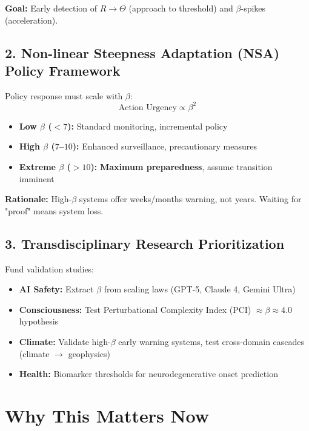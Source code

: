 \documentclass[11pt,a4paper]{article}
\begin{document}
\textbf{Goal:} Early detection of $R \to \Theta$ (approach to threshold) and $\beta$-spikes (acceleration).

\subsection*{2. Non-linear Steepness Adaptation (NSA) Policy Framework}

Policy response must scale with $\beta$:
\begin{equation*}
\text{Action Urgency} \propto \beta^2
\end{equation*}

\begin{itemize}
\item \textbf{Low $\beta$ ($< 7$):} Standard monitoring, incremental policy
\item \textbf{High $\beta$ ($7$--$10$):} Enhanced surveillance, precautionary measures
\item \textbf{Extreme $\beta$ ($> 10$):} \textbf{Maximum preparedness}, assume transition imminent
\end{itemize}

\textbf{Rationale:} High-$\beta$ systems offer weeks/months warning, not years. Waiting for "proof" means system loss.

\subsection*{3. Transdisciplinary Research Prioritization}

Fund validation studies:
\begin{itemize}
\item \textbf{AI Safety:} Extract $\beta$ from scaling laws (GPT-5, Claude 4, Gemini Ultra)
\item \textbf{Consciousness:} Test Perturbational Complexity Index (PCI) $\approx \beta \approx 4.0$ hypothesis
\item \textbf{Climate:} Validate high-$\beta$ early warning systems, test cross-domain cascades (climate $\to$ geophysics)
\item \textbf{Health:} Biomarker thresholds for neurodegenerative onset prediction
\end{itemize}

\section*{Why This Matters Now}
\end{document}
